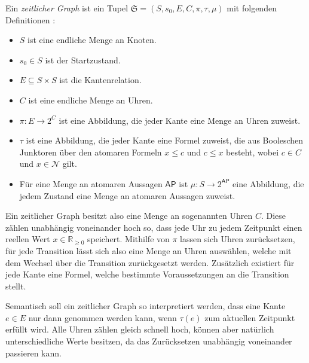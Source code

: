 \begin{definition}
	Ein \textit{zeitlicher Graph} ist ein Tupel $\mathfrak{S}=(S,s_0,E,C,\pi,\tau,\mu)$ mit folgenden Definitionen \cite{alur1990model}:
	\begin{itemize}
		\item $S$ ist eine endliche Menge an Knoten.
		\item $s_0\in S$ ist der Startzustand.
		\item $E\subseteq S\times S$ ist die Kantenrelation.
		\item $C$ ist eine endliche Menge an Uhren.
		\item $\pi:E\to 2^C$ ist eine Abbildung, die jeder Kante eine Menge an Uhren zuweist.
		\item $\tau$ ist eine Abbildung, die jeder Kante eine Formel zuweist, die aus Booleschen Junktoren über den atomaren Formeln $x\leq c$ und $c\leq x$ besteht, wobei $c\in C$ und $x\in \mathcal{N}$ gilt.
		\item Für eine Menge an atomaren Aussagen $\mathsf{AP}$ ist $\mu:S\to 2^{\mathsf{AP}}$ eine Abbildung, die jedem Zustand eine Menge an atomaren Aussagen zuweist.
	\end{itemize}
	
	Ein zeitlicher Graph besitzt also eine Menge an sogenannten Uhren $C$.
	Diese zählen unabhängig voneinander hoch so, dass jede Uhr zu jedem \glqq Zeitpunkt\grqq{} einen reellen Wert $x\in \mathbb{R}_{\geq 0}$ speichert.
	Mithilfe von $\pi$ lassen sich Uhren zurücksetzen, für jede Transition lässt sich also eine Menge an Uhren auswählen, welche mit dem Wechsel über die Transition zurückgesetzt werden.
	Zusätzlich existiert für jede Kante eine Formel, welche bestimmte Voraussetzungen an die Transition stellt.
\end{definition}

Semantisch soll ein zeitlicher Graph so interpretiert werden, dass eine Kante $e\in E$ nur dann genommen werden kann, wenn $\tau(e)$ zum aktuellen Zeitpunkt erfüllt wird.
Alle Uhren zählen gleich schnell hoch, können aber natürlich unterschiedliche Werte besitzen, da das Zurücksetzen unabhängig voneinander passieren kann.

